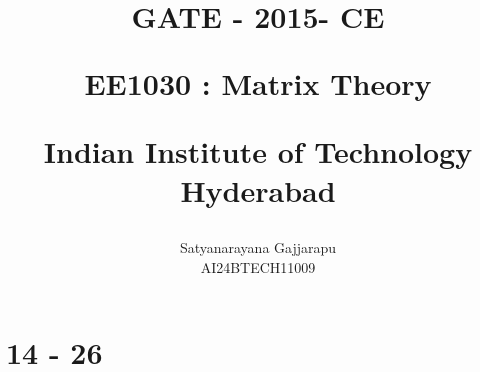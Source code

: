 \documentclass[journal]{IEEEtran}
\begin{document}

\vspace{3cm}




\title{
GATE - 2015- CE

\large{EE1030 : Matrix Theory}

Indian Institute of Technology Hyderabad
}
\author{Satyanarayana Gajjarapu

AI24BTECH11009
}	





\maketitle




\bigskip

\renewcommand{\thefigure}{\theenumi}
\renewcommand{\thetable}{\theenumi}


\section{14 - 26}
\end{document}
